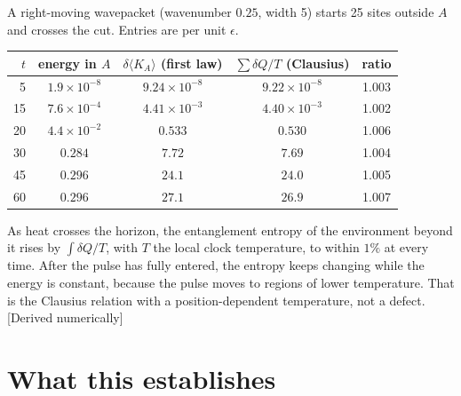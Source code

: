 \documentclass[11pt]{article}
\newcommand{\st}[1]{\textsf{\small[#1]}}
\begin{document}
A right-moving wavepacket (wavenumber $0.25$, width 5) starts 25 sites outside $A$ and crosses the cut. Entries are per unit $\epsilon$.
\begin{center}
\begin{tabular}{@{}rcccc@{}}
\toprule
$t$ & energy in $A$ & $\delta\langle K_A\rangle$ (first law) & $\sum\delta Q/T$ (Clausius) & ratio \\
\midrule
5 & $1.9\times10^{-8}$ & $9.24\times10^{-8}$ & $9.22\times10^{-8}$ & 1.003 \\
15 & $7.6\times10^{-4}$ & $4.41\times10^{-3}$ & $4.40\times10^{-3}$ & 1.002 \\
20 & $4.4\times10^{-2}$ & $0.533$ & $0.530$ & 1.006 \\
30 & $0.284$ & $7.72$ & $7.69$ & 1.004 \\
45 & $0.296$ & $24.1$ & $24.0$ & 1.005 \\
60 & $0.296$ & $27.1$ & $26.9$ & 1.007 \\
\bottomrule
\end{tabular}
\end{center}
As heat crosses the horizon, the entanglement entropy of the environment beyond it rises by $\int\delta Q/T$, with $T$ the local clock temperature, to within $1\%$ at every time. After the pulse has fully entered, the entropy keeps changing while the energy is constant, because the pulse moves to regions of lower temperature. That is the Clausius relation with a position-dependent temperature, not a defect. \st{Derived numerically}

\section{What this establishes}
\end{document}
